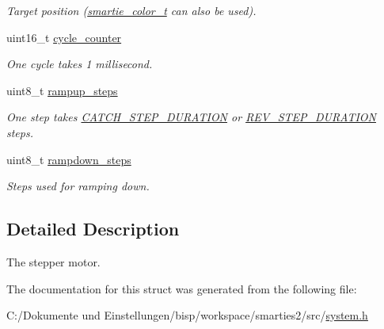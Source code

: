 \begin{CompactItemize}
\begin{CompactList}\small\item\em Target position (\hyperlink{system_8h_7b19b2744b17f8f369226dd73101a4b2}{smartie\_\-color\_\-t} can also be used). \item\end{CompactList}\item 
\hypertarget{structengine__t_c7983a77b4ec1056dc7f2ca04e3a319c}{
uint16\_\-t \hyperlink{structengine__t_c7983a77b4ec1056dc7f2ca04e3a319c}{cycle\_\-counter}}
\label{structengine__t_c7983a77b4ec1056dc7f2ca04e3a319c}

\begin{CompactList}\small\item\em One cycle takes 1 millisecond. \item\end{CompactList}\item 
\hypertarget{structengine__t_14cb2582f58d67f3522b4fae1812ab9f}{
uint8\_\-t \hyperlink{structengine__t_14cb2582f58d67f3522b4fae1812ab9f}{rampup\_\-steps}}
\label{structengine__t_14cb2582f58d67f3522b4fae1812ab9f}

\begin{CompactList}\small\item\em One step takes \hyperlink{system_8h_09bccded49054a78a07e0d63439e9963}{CATCH\_\-STEP\_\-DURATION} or \hyperlink{system_8h_a2e7a288930ea3e5c40dd46d9710c3c4}{REV\_\-STEP\_\-DURATION} steps. \item\end{CompactList}\item 
\hypertarget{structengine__t_67c13207b86747539fde382ca3f4a218}{
uint8\_\-t \hyperlink{structengine__t_67c13207b86747539fde382ca3f4a218}{rampdown\_\-steps}}
\label{structengine__t_67c13207b86747539fde382ca3f4a218}

\begin{CompactList}\small\item\em Steps used for ramping down. \item\end{CompactList}\end{CompactItemize}


\subsection{Detailed Description}
The stepper motor. 

The documentation for this struct was generated from the following file:\begin{CompactItemize}
\item 
C:/Dokumente und Einstellungen/bisp/workspace/smarties2/src/\hyperlink{system_8h}{system.h}\end{CompactItemize}
